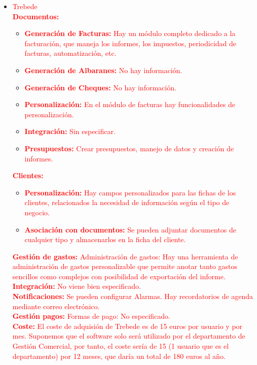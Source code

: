 \documentclass{article}
\begin{document}
\begin{itemize}
\begin{itemize}
\item \textcolor{Red}{Trebede\\}
\textcolor{Red}{\textbf{Documentos:}}
\begin{itemize}
\item \textcolor{Red}{\textbf{Generación de Facturas:} Hay un módulo completo dedicado a la facturación, que maneja los informes, los impuestos, periodicidad de facturas, automatización, etc.}
\item \textcolor{Red}{\textbf{Generación de Albaranes:} No hay información.} 
\item \textcolor{Red}{\textbf{Generación de Cheques:} No hay información.} 
\item \textcolor{Red}{\textbf{Personalización:} En el módulo de facturas hay funcionalidades de personalización.}
\item \textcolor{Red}{\textbf{Integración:} Sin especificar.} 
\item \textcolor{Red}{\textbf{Presupuestos:} Crear presupuestos, manejo de datos y creación de informes.}
\end{itemize}
\textcolor{Red}{\textbf{Clientes:}}
\begin{itemize}
\item \textcolor{Red}{\textbf{Personalización:} Hay campos personalizados para las fichas de los clientes, relacionados la necesidad de información según el tipo de negocio.} 
\item \textcolor{Red}{\textbf{Asociación con documentos:} Se pueden adjuntar documentos de cualquier tipo y almacenarlos en la ficha del cliente.}
\end{itemize}
\textcolor{Red}{\textbf{Gestión de gastos:} Administración de gastos: Hay una herramienta de administración de gastos personalizable que permite anotar tanto gastos sencillos como complejos con posibilidad de exportación del informe.\\}
\textcolor{Red}{\textbf{Integración:} No viene bien especificado.\\}
\textcolor{Red}{\textbf{Notificaciones:} Se pueden configurar Alarmas. Hay recordatorios de agenda mediante correo electrónico.\\}
\textcolor{Red}{\textbf{Gestión pagos:} Formas de pago: No especificado.\\}
\textcolor{Red}{\textbf{Coste:} El coste de adquisión de Trebede es de 15 euros por usuario y por mes. Suponemos que el software solo será utilizado por el departamento de Gestión Comercial, por tanto, el coste sería de 15 (1 usuario que es el departamento) por 12 meses, que daría un total de 180 euros al año.}

\end{itemize}
\end{itemize}
\end{document}
